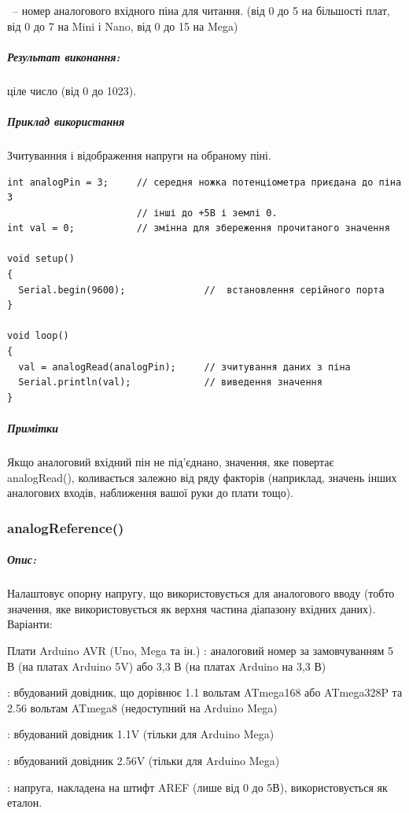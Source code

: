 \documentclass[12pt,a4paper]{report}  %
\begin{document}
~-- номер аналогового вхідного піна для читання. (від 0 до 5 на більшості плат, від 0 до 7 на Mini і Nano, від 0 до 15 на Mega)

\subparagraph{Результат виконання:} ціле число  (від 0 до 1023).

\subparagraph{Приклад використання}

Зчитуванння і відображення напруги на обраному піні.
\begin{lstlisting}[label=digitalwrite,caption=Використання функції digitalWrite()]
int analogPin = 3;     // середня ножка потенціометра приєдана до піна 3
                       // інші до +5В і землі 0.
int val = 0;           // змінна для збереження прочитаного значення

void setup()
{
  Serial.begin(9600);              //  встановлення серійного порта
}

void loop()
{
  val = analogRead(analogPin);     // зчитування даних з піна
  Serial.println(val);             // виведення значення
}
\end{lstlisting}

\subparagraph{Примітки}

Якщо аналоговий вхідний пін не під'єднано, значення, яке повертає analogRead(), коливається залежно від ряду факторів (наприклад, значень інших аналогових входів, наближення вашої руки до плати тощо).

\subsubsection{analogReference()}\label{analogReference}

\subparagraph{Опис:} Налаштовує опорну напругу, що використовується для аналогового вводу (тобто значення, яке використовується як верхня частина діапазону вхідних даних). Варіанти:

Плати Arduino AVR (Uno, Mega та ін.)
    : аналоговий номер за замовчуванням 5 В (на платах Arduino 5V) або 3,3 В (на платах Arduino на 3,3 В)

    : вбудований довідник, що дорівнює 1.1 вольтам ATmega168 або ATmega328P та 2.56 вольтам ATmega8 (недоступний на Arduino Mega)

    : вбудований довідник 1.1V (тільки для Arduino Mega)

    : вбудований довідник 2.56V (тільки для Arduino Mega)

    : напруга, накладена на штифт AREF (лише від 0 до 5В), використовується як еталон.
\end{document}
